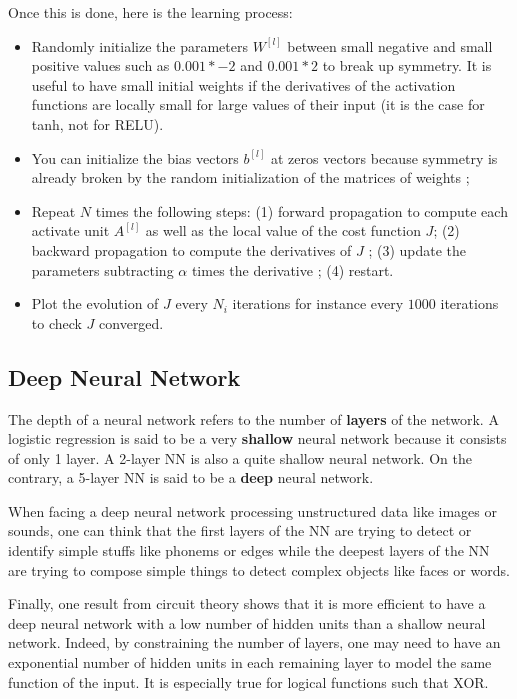 \documentclass[a4paper, 12pt]{article}
\begin{document}
Once this is done, here is the learning process:

\begin{itemize}
\item Randomly initialize the parameters $W^{[l]}$ between small negative and small positive values such as $0.001 * -2$ and $0.001 * 2$ to break up symmetry. It is useful to have small initial weights if the derivatives of the activation functions are locally small for large values of their input (it is the case for tanh, not for RELU).
\item You can initialize the bias vectors $b^{[l]}$ at zeros vectors because symmetry is already broken by the random initialization of the matrices of weights ;
\item Repeat $N$ times the following steps: (1) forward propagation to compute each activate unit $A^{[l]}$ as well as the local value of the cost function $J$; (2) backward propagation to compute the derivatives of $J$ ; (3) update the parameters subtracting $\alpha$ times the derivative ; (4) restart.
\item Plot the evolution of $J$ every $N_{i}$ iterations for instance every $1 000$ iterations to check $J$ converged.
\end{itemize}

\subsection{Deep Neural Network}

The depth of a neural network refers to the number of \textbf{layers} of the network. A logistic regression is said to be a very \textbf{shallow} neural network because it consists of only 1 layer. A 2-layer NN is also a quite shallow neural network. On the contrary, a 5-layer NN is said to be a \textbf{deep} neural network.

When facing a deep neural network processing unstructured data like images or sounds, one can think that the first layers of the NN are trying to detect or identify simple stuffs like phonems or edges while the deepest layers of the NN are trying to compose simple things to detect complex objects like faces or words. 

Finally, one result from circuit theory shows that it is more efficient to have a deep neural network with a low number of hidden units than a shallow neural network. Indeed, by constraining the number of layers, one may need to have an exponential number of hidden units in each remaining layer to model the same function of the input. It is especially true for logical functions such that XOR. 
\end{document}
